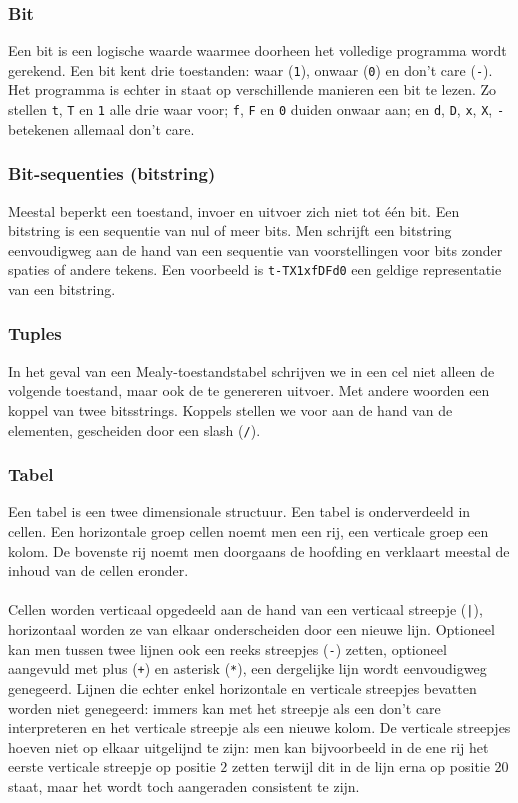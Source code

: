 \subsubsection{Bit}
Een bit is een logische waarde waarmee doorheen het volledige programma wordt gerekend. Een bit kent drie toestanden: waar (\texttt{1}), onwaar (\texttt{0}) en don't care (\texttt{-}). Het programma is echter in staat op verschillende manieren een bit te lezen. Zo stellen \texttt{t}, \texttt{T} en \texttt{1} alle drie waar voor; \texttt{f}, \texttt{F} en \texttt{0} duiden onwaar aan; en \texttt{d}, \texttt{D}, \texttt{x}, \texttt{X}, \texttt{-} betekenen allemaal don't care.
\subsubsection{Bit-sequenties (bitstring)}
Meestal beperkt een toestand, invoer en uitvoer zich niet tot \'e\'en bit. Een bitstring is een sequentie van nul of meer bits. Men schrijft een bitstring eenvoudigweg aan de hand van een sequentie van voorstellingen voor bits zonder spaties of andere tekens. Een voorbeeld is \texttt{t-TX1xfDFd0} een geldige representatie van een bitstring.
\subsubsection{Tuples}
In het geval van een Mealy-toestandstabel schrijven we in een cel niet alleen de volgende toestand, maar ook de te genereren uitvoer. Met andere woorden een koppel van twee bitsstrings. Koppels stellen we voor aan de hand van de elementen, gescheiden door een slash (\verb+/+).
\subsubsection{Tabel}
Een tabel is een twee dimensionale structuur. Een tabel is onderverdeeld in cellen. Een horizontale groep cellen noemt men een rij, een verticale groep een kolom. De bovenste rij noemt men doorgaans de hoofding en verklaart meestal de inhoud van de cellen eronder.
\paragraph{}
Cellen worden verticaal opgedeeld aan de hand van een verticaal streepje (\texttt{|}), horizontaal worden ze van elkaar onderscheiden door een nieuwe lijn. Optioneel kan men tussen twee lijnen ook een reeks streepjes (\texttt{-}) zetten, optioneel aangevuld met plus (\texttt{+}) en asterisk (\texttt{*}), een dergelijke lijn wordt eenvoudigweg genegeerd. Lijnen die echter enkel horizontale en verticale streepjes bevatten worden niet genegeerd: immers kan met het streepje als een don't care interpreteren en het verticale streepje als een nieuwe kolom. De verticale streepjes hoeven niet op elkaar uitgelijnd te zijn: men kan bijvoorbeeld in de ene rij het eerste verticale streepje op positie $2$ zetten terwijl dit in de lijn erna op positie $20$ staat, maar het wordt toch aangeraden consistent te zijn.

